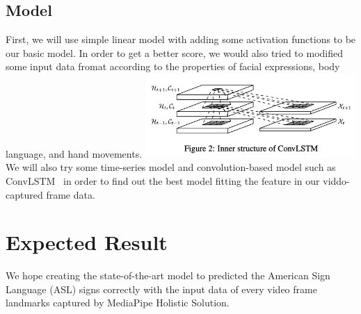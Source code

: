 \documentclass[10pt,twocolumn,letterpaper]{article}
\begin{document}
\begin{CJK*}{UTF8}{bsmi}
\subsection{Model}
First, we will use simple linear model with adding some activation functions to be our basic model.
In order to get a better score, we would also tried to modified some input data fromat according to the properties of facial expressions, body language, and hand movements.
\includegraphics[width=80mm]{ConvLSTM}
We will also try some time-series model and convolution-based model such as ConvLSTM~\cite{NIPS2015_07563a3f} in order to find out the best model fitting the feature in our viddo-captured frame data.


\section{Expected Result}
We hope creating the state-of-the-art model to predicted the American Sign Language (ASL) signs correctly
with the input data of every video frame landmarks captured by MediaPipe Holistic Solution.




{\small


}

\end{CJK*}
\end{document}
